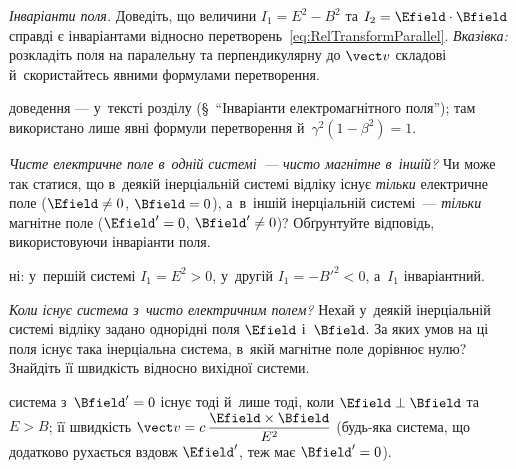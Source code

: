 \begin{problem}\label{prb:FieldInvariants}
	\emph{Інваріанти поля.} Доведіть, що величини $I_1 = E^2 - B^2$ та $I_2 =
	\Efield\cdot\Bfield$ справді є інваріантами відносно
	перетворень~\eqref{eq:RelTransformParallel}. \emph{Вказівка:} розкладіть поля на
	паралельну та перпендикулярну до $\vect v$ складові й~скористайтесь явними формулами
	перетворення.
	\begin{solution}
		доведення --- у~тексті розділу (\S~\enquote{Інваріанти електромагнітного поля}); там використано лише явні формули перетворення й~$\gamma^2(1-\beta^2)=1$.
	\end{solution}
\end{problem}

\begin{problem}\label{prb:PureEandB}
	\emph{Чисте електричне поле в~одній системі~--- чисто магнітне в~іншій?} Чи може так
	статися, що в~деякій інерціальній системі відліку існує \emph{тільки} електричне поле
	($\Efield \neq 0$, $\Bfield = 0$), а~в~іншій інерціальній системі~--- \emph{тільки}
	магнітне поле ($\Efield' = 0$, $\Bfield' \neq 0$)? Обґрунтуйте відповідь,
	використовуючи інваріанти поля.
	\begin{solution}
		ні: у~першій системі $I_1 = E^2 > 0$, у~другій $I_1 = -B'^2 < 0$, а~$I_1$ інваріантний.
	\end{solution}
\end{problem}

\begin{problem}\label{prb:PureElectricExist}
	\emph{Коли існує система з~чисто електричним полем?} Нехай у~деякій інерціальній
	системі відліку задано однорідні поля $\Efield$ і~$\Bfield$. За яких умов на ці поля
	існує така інерціальна система, в~якій магнітне поле дорівнює нулю? Знайдіть її
	швидкість відносно вихідної системи.
	\begin{solution}
		система з~$\Bfield' = 0$ існує тоді й~лише тоді, коли $\Efield\perp \Bfield$ та $E > B$; її швидкість $\vect v = c\,\dfrac{\Efield\times\Bfield}{E^2}$ (будь-яка система, що додатково рухається вздовж $\Efield'$, теж має $\Bfield'=0$).
	\end{solution}
\end{problem}

